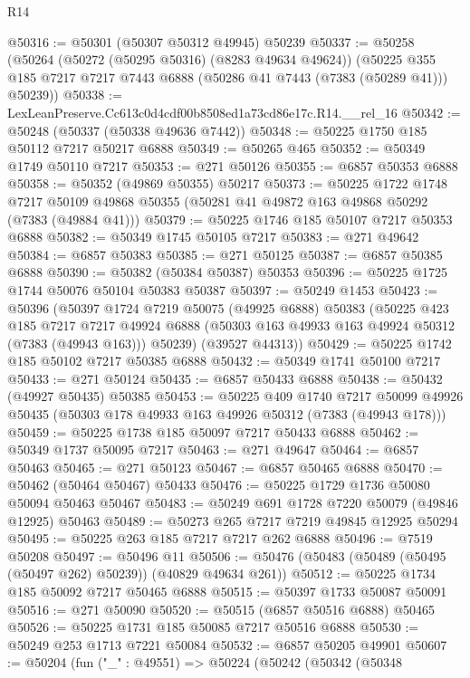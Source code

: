 \begin{lexlean}{R14}
\begin{coremodule}
@50316 := @50301 (@50307 @50312 @49945) @50239
@50337 := @50258
    (@50264
      (@50272 (@50295 @50316) (@8283 @49634 @49624))
      (@50225 @355 @185 @7217 @7217 @7443 @6888 (@50286 @41 @7443 (@7383 (@50289 @41))) @50239))
@50338 := LexLeanPreserve.Cc613c0d4cdf00b8508ed1a73cd86e17c.R14.__rel_16
@50342 := @50248 (@50337 (@50338 @49636 @7442))
@50348 := @50225 @1750 @185 @50112 @7217 @50217 @6888
@50349 := @50265 @465
@50352 := @50349 @1749 @50110 @7217
@50353 := @271 @50126
@50355 := @6857 @50353 @6888
@50358 := @50352 (@49869 @50355) @50217
@50373 := @50225
    @1722
    @1748
    @7217
    @50109
    @49868
    @50355
    (@50281 @41 @49872 @163 @49868 @50292 (@7383 (@49884 @41)))
@50379 := @50225 @1746 @185 @50107 @7217 @50353 @6888
@50382 := @50349 @1745 @50105 @7217
@50383 := @271 @49642
@50384 := @6857 @50383
@50385 := @271 @50125
@50387 := @6857 @50385 @6888
@50390 := @50382 (@50384 @50387) @50353
@50396 := @50225 @1725 @1744 @50076 @50104 @50383 @50387
@50397 := @50249 @1453
@50423 := @50396
    (@50397
      @1724
      @7219
      @50075
      (@49925 @6888)
      @50383
      (@50225
        @423
        @185
        @7217
        @7217
        @49924
        @6888
        (@50303 @163 @49933 @163 @49924 @50312 (@7383 (@49943 @163)))
        @50239)
      (@39527 @44313))
@50429 := @50225 @1742 @185 @50102 @7217 @50385 @6888
@50432 := @50349 @1741 @50100 @7217
@50433 := @271 @50124
@50435 := @6857 @50433 @6888
@50438 := @50432 (@49927 @50435) @50385
@50453 := @50225
    @409
    @1740
    @7217
    @50099
    @49926
    @50435
    (@50303 @178 @49933 @163 @49926 @50312 (@7383 (@49943 @178)))
@50459 := @50225 @1738 @185 @50097 @7217 @50433 @6888
@50462 := @50349 @1737 @50095 @7217
@50463 := @271 @49647
@50464 := @6857 @50463
@50465 := @271 @50123
@50467 := @6857 @50465 @6888
@50470 := @50462 (@50464 @50467) @50433
@50476 := @50225 @1729 @1736 @50080 @50094 @50463 @50467
@50483 := @50249 @691 @1728 @7220 @50079 (@49846 @12925) @50463
@50489 := @50273 @265 @7217 @7219 @49845 @12925 @50294
@50495 := @50225 @263 @185 @7217 @7217 @262 @6888
@50496 := @7519 @50208
@50497 := @50496 @11
@50506 := @50476 (@50483 (@50489 (@50495 (@50497 @262) @50239)) (@40829 @49634 @261))
@50512 := @50225 @1734 @185 @50092 @7217 @50465 @6888
@50515 := @50397 @1733 @50087 @50091
@50516 := @271 @50090
@50520 := @50515 (@6857 @50516 @6888) @50465
@50526 := @50225 @1731 @185 @50085 @7217 @50516 @6888
@50530 := @50249 @253 @1713 @7221 @50084
@50532 := @6857 @50205 @49901
@50607 := @50204
    (fun ("_" : @49551) =>
    @50224
      (@50242
        (@50342
          (@50348

\end{coremodule}
\end{lexlean}
